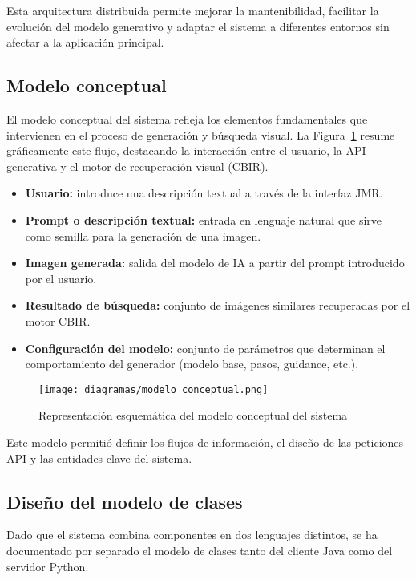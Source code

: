 Esta arquitectura distribuida permite mejorar la mantenibilidad, facilitar la evolución del modelo generativo y adaptar el sistema a diferentes entornos sin afectar a la aplicación principal.

\subsection{Modelo conceptual}

El modelo conceptual del sistema refleja los elementos fundamentales que intervienen en el proceso de generación y búsqueda visual. La Figura~\ref{fig:modelo-conceptual} resume gráficamente este flujo, destacando la interacción entre el usuario, la API generativa y el motor de recuperación visual (CBIR).

\begin{itemize}
    \item \textbf{Usuario:} introduce una descripción textual a través de la interfaz JMR.
    \item \textbf{Prompt o descripción textual:} entrada en lenguaje natural que sirve como semilla para la generación de una imagen.
    \item \textbf{Imagen generada:} salida del modelo de IA a partir del prompt introducido por el usuario.
    \item \textbf{Resultado de búsqueda:} conjunto de imágenes similares recuperadas por el motor CBIR.
    \item \textbf{Configuración del modelo:} conjunto de parámetros que determinan el comportamiento del generador (modelo base, pasos, guidance, etc.).
\end{itemize}

\begin{figure}[H]
    \centering
    \texttt{[image: diagramas/modelo\_conceptual.png]}
    \caption{Representación esquemática del modelo conceptual del sistema}
    \label{fig:modelo-conceptual}
\end{figure}


Este modelo permitió definir los flujos de información, el diseño de las peticiones API y las entidades clave del sistema.


\subsection{Diseño del modelo de clases}

Dado que el sistema combina componentes en dos lenguajes distintos, se ha documentado por separado el modelo de clases tanto del cliente Java como del servidor Python.

